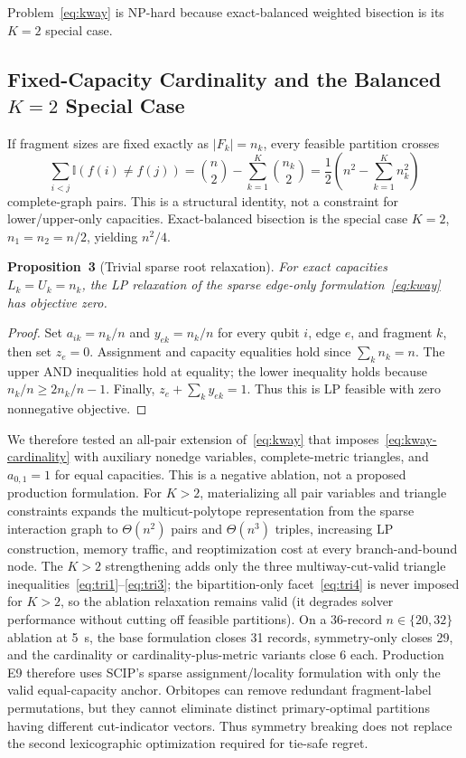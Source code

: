 \documentclass[11pt]{article}
\begin{document}
Problem~\eqref{eq:kway} is NP-hard because exact-balanced weighted bisection is its $K=2$ special case.

\subsection{Fixed-Capacity Cardinality and the Balanced $K\!=\!2$ Special Case}

If fragment sizes are fixed exactly as $|F_k|=n_k$, every feasible partition crosses
\begin{equation}
  \sum_{i<j}\mathbb{I}(f(i)\neq f(j))
  = \binom{n}{2}-\sum_{k=1}^{K}\binom{n_k}{2}
  = \frac12\left(n^2-\sum_{k=1}^{K}n_k^2\right)
  \label{eq:kway-cardinality}
\end{equation}
complete-graph pairs. This is a structural identity, not a constraint for lower/upper-only capacities. Exact-balanced bisection is the special case $K=2$, $n_1=n_2=n/2$, yielding $n^2/4$.

\textbf{Proposition~3} (Trivial sparse root relaxation). \textit{For exact capacities $L_k=U_k=n_k$, the LP relaxation of the sparse edge-only formulation~\eqref{eq:kway} has objective zero.}

\begin{proof} Set $a_{ik}=n_k/n$ and $y_{ek}=n_k/n$ for every qubit $i$, edge $e$, and fragment $k$, then set $z_e=0$. Assignment and capacity equalities hold since $\sum_kn_k=n$. The upper AND inequalities hold at equality; the lower inequality holds because $n_k/n\geq2n_k/n-1$. Finally, $z_e+\sum_ky_{ek}=1$. Thus this is LP feasible with zero nonnegative objective.\end{proof}

We therefore tested an all-pair extension of~\eqref{eq:kway} that imposes~\eqref{eq:kway-cardinality} with auxiliary nonedge variables, complete-metric triangles, and $a_{0,1}=1$ for equal capacities. This is a negative ablation, not a proposed production formulation. For $K>2$, materializing all pair variables and triangle constraints expands the multicut-polytope representation from the sparse interaction graph to $\Theta(n^2)$ pairs and $\Theta(n^3)$ triples, increasing LP construction, memory traffic, and reoptimization cost at every branch-and-bound node. The $K>2$ strengthening adds only the three multiway-cut-valid triangle inequalities~\eqref{eq:tri1}--\eqref{eq:tri3}; the bipartition-only facet~\eqref{eq:tri4} is never imposed for $K>2$, so the ablation relaxation remains valid (it degrades solver performance without cutting off feasible partitions). On a 36-record $n\in\{20,32\}$ ablation at 5~s, the base formulation closes 31 records, symmetry-only closes 29, and the cardinality or cardinality-plus-metric variants close 6 each. Production E9 therefore uses SCIP's sparse assignment/locality formulation with only the valid equal-capacity anchor. Orbitopes can remove redundant fragment-label permutations, but they cannot eliminate distinct primary-optimal partitions having different cut-indicator vectors. Thus symmetry breaking does not replace the second lexicographic optimization required for tie-safe regret.
\end{document}
